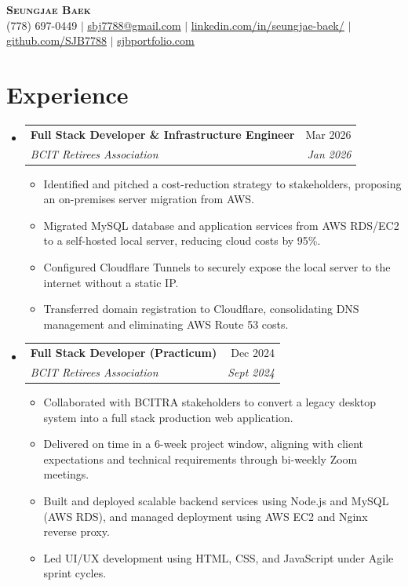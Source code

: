 \documentclass[letterpaper,11pt]{article}
\makeatletter
\newcommand{\resumeItem}[1]{
\item\small{
{#1 \vspace{-2pt}}
}
}
\newcommand{\resumeSubheading}[4]{
\vspace{-2pt}\item
\begin{tabular*}{0.97\textwidth}[t]{l@{\extracolsep{\fill}}r}
\textbf{#1} & #2 \\
\textit{\small#3} & \textit{\small #4} \\
\end{tabular*}\vspace{-7pt}
}
\newcommand{\resumeSubHeadingListStart}{\begin{itemize}[leftmargin=0.15in, label={}]}
\newcommand{\resumeSubHeadingListEnd}{\end{itemize}}
\newcommand{\resumeItemListStart}{\begin{itemize}}
\newcommand{\resumeItemListEnd}{\end{itemize}\vspace{-5pt}}
\makeatother
\begin{document}
\begin{center}
\textbf{\Huge \scshape Seungjae Baek} \\ \vspace{1pt}
\small (778) 697-0449 $|$ \href{mailto:sbj7788@gmail.com}{\underline{sbj7788@gmail.com}} $|$
\href{https://linkedin.com/in/seungjae-baek/}{\underline{linkedin.com/in/seungjae-baek/}} $|$
\href{https://github.com/SJB7788}{\underline{github.com/SJB7788}} $|$
\href{https://sjbportfolio.com}{\underline{sjbportfolio.com}}
\end{center}


\section{Experience}
\resumeSubHeadingListStart
\resumeSubheading{Full Stack Developer \& Infrastructure Engineer}{Mar 2026}{BCIT Retirees Association}{Jan 2026}
\resumeItemListStart
\resumeItem{Identified and pitched a cost-reduction strategy to stakeholders, proposing an on-premises server migration from AWS.}
\resumeItem{Migrated MySQL database and application services from AWS RDS/EC2 to a self-hosted local server, reducing cloud costs by 95\%.}
\resumeItem{Configured Cloudflare Tunnels to securely expose the local server to the internet without a static IP.}
\resumeItem{Transferred domain registration to Cloudflare, consolidating DNS management and eliminating AWS Route 53 costs.}
\resumeItemListEnd
\resumeSubheading{Full Stack Developer (Practicum)}{Dec 2024}{BCIT Retirees Association}{Sept 2024}
\resumeItemListStart
\resumeItem{Collaborated with BCITRA stakeholders to convert a legacy desktop system into a full stack production web application.}
\resumeItem{Delivered on time in a 6-week project window, aligning with client expectations and technical requirements through bi-weekly Zoom meetings.}
\resumeItem{Built and deployed scalable backend services using Node.js and MySQL (AWS RDS), and managed deployment using AWS EC2 and Nginx reverse proxy.}
\resumeItem{Led UI/UX development using HTML, CSS, and JavaScript under Agile sprint cycles.}
\resumeItemListEnd
\resumeSubHeadingListEnd
\end{document}
